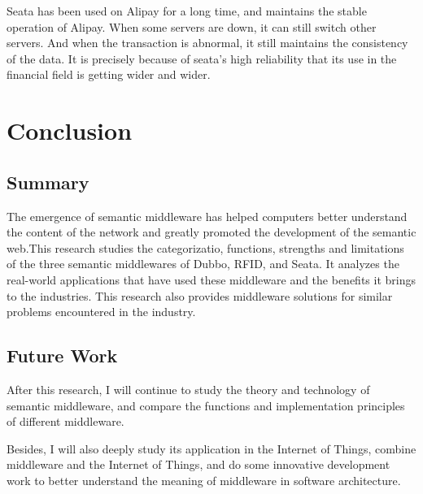 \documentclass[conference]{IEEEtran}
\begin{document}
Seata has been used on Alipay for a long time, and maintains the stable operation of Alipay. When some servers are down, it can still switch other servers. And when the transaction is abnormal, it still maintains the consistency of the data. It is precisely because of seata's high reliability that its use in the financial field is getting wider and wider.


\section{Conclusion}

\subsection{Summary}
The emergence of semantic middleware has helped computers better understand the content of the network and greatly promoted the development of the semantic web.This research studies the categorizatio, functions, strengths and limitations of the three semantic middlewares of Dubbo, RFID, and Seata. It analyzes the real-world applications that have used these middleware and the benefits it brings to the industries. This research also provides middleware solutions for similar problems encountered in the industry.


\subsection{Future Work}
After this research, I will continue to study the theory and technology of semantic middleware, and compare the functions and implementation principles of different middleware.

Besides, I will also deeply study its application in the Internet of Things, combine middleware and the Internet of Things, and do some innovative development work to better understand the meaning of middleware in software architecture.
\end{document}
